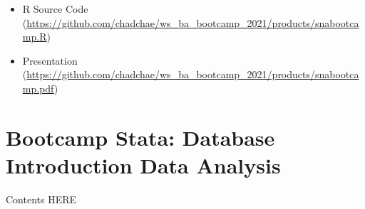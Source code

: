\documentclass[
]{book}
\providecommand{\tightlist}{%
  \setlength{\itemsep}{0pt}\setlength{\parskip}{0pt}}
\begin{document}
\begin{itemize}
\tightlist
\item
  R Source Code (\url{https://github.com/chadchae/ws_ba_bootcamp_2021/products/snabootcamp.R})
\item
  Presentation (\url{https://github.com/chadchae/ws_ba_bootcamp_2021/products/snabootcamp.pdf})
\end{itemize}

\hypertarget{bootcamp-stata-database-introduction-data-analysis}{%
\chapter{Bootcamp Stata: Database Introduction Data Analysis}\label{bootcamp-stata-database-introduction-data-analysis}}

Contents HERE
\end{document}
